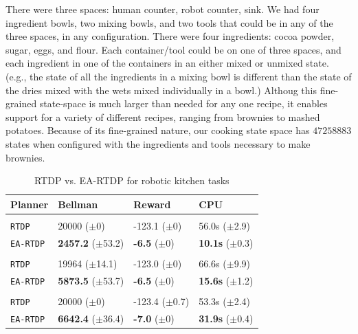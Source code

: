\documentclass[letterpaper]{article}
\newcommand{\ra}[1]{\renewcommand{\arraystretch}{#1}} %
\begin{document}
There were three spaces: human counter, robot counter, sink.  We had
four ingredient bowls, two mixing bowls, and two tools that could be
in any of the three spaces, in any configuration.  There were four
ingredients: cocoa powder, sugar, eggs, and flour.  Each
container/tool could be on one of three spaces, and each ingredient in
one of the containers in an either mixed or unmixed state.  (e.g., the
state of all the ingredients in a mixing bowl is different than the
state of the dries mixed with the wets mixed individually in a bowl.)
Althoug this fine-grained state-space is much larger than needed for
any one recipe, it enables support for a variety of different recipes,
ranging from brownies to mashed potatoes.  Because of its
fine-grained nature, our cooking state space has
$\num[round-precision=3, round-mode=figures]{47258883}$ states when
configured with the ingredients and tools necessary to make brownies.

\begin{table}[t]
\ra{1.1}
\small
\begin{tabular}{@{}llll@{}}\toprule
Planner & Bellman & Reward & CPU \\ \midrule
&\hspace{-10mm}{\it Dry Ingredients} \\
\texttt{RTDP} 	& 20000 ($\pm$0) 			& {-123.1} ($\pm$0)  & {56.0s}   ($\pm$2.9) \\
\texttt{EA-RTDP} 	& {\bf 2457.2} ($\pm$53.2) 		& {\bf -6.5}   ($\pm$0) & {\bf 10.1s}   ($\pm$0.3) \\  \hline
&\hspace{-10mm}{\it Wet Ingredients} \\
\texttt{RTDP} 	& 19964 ($\pm$14.1) 			& { -123.0}   ($\pm$0) & 66.6s   ($\pm$9.9) \\
\texttt{EA-RTDP} 	& {\bf 5873.5} ($\pm$53.7) 		& {\bf -6.5}   ($\pm$0) & {\bf 15.6s}   ($\pm$1.2) \\ \hline
&\hspace{-10mm}{\it Brownie Batter} \\
\texttt{RTDP} 	& 20000 ($\pm$0) 			& -123.4   ($\pm$0.7) & { 53.3s}   ($\pm$2.4) \\
\texttt{EA-RTDP} 	& {\bf 6642.4} ($\pm$36.4) 		& {\bf -7.0}   ($\pm$0) & {\bf 31.9s}   ($\pm$0.4) \\ 
\bottomrule
\end{tabular}
\caption{RTDP vs. EA-RTDP for robotic kitchen tasks}
\label{table:baxter_results}
\end{table}
\end{document}
